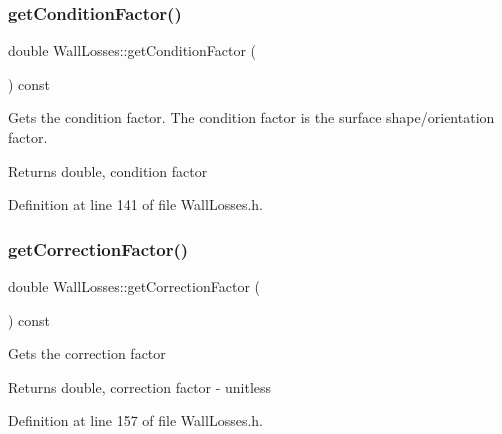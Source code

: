 \subsubsection{\texorpdfstring{get\+Condition\+Factor()}{getConditionFactor()}\hspace{0.1cm}{\footnotesize\ttfamily [3/3]}}
{\footnotesize\ttfamily double Wall\+Losses\+::get\+Condition\+Factor (\begin{DoxyParamCaption}{ }\end{DoxyParamCaption}) const\hspace{0.3cm}{\ttfamily [inline]}}

Gets the condition factor. The condition factor is the surface shape/orientation factor. \begin{DoxyReturn}{Returns}
double, condition factor 
\end{DoxyReturn}


Definition at line 141 of file Wall\+Losses.\+h.

\mbox{\label{class_wall_losses_a4ce6a0ec36cd868b14b041f18251cb6d}} 
\subsubsection{\texorpdfstring{get\+Correction\+Factor()}{getCorrectionFactor()}\hspace{0.1cm}{\footnotesize\ttfamily [1/3]}}
{\footnotesize\ttfamily double Wall\+Losses\+::get\+Correction\+Factor (\begin{DoxyParamCaption}{ }\end{DoxyParamCaption}) const\hspace{0.3cm}{\ttfamily [inline]}}

Gets the correction factor \begin{DoxyReturn}{Returns}
double, correction factor -\/ unitless 
\end{DoxyReturn}


Definition at line 157 of file Wall\+Losses.\+h.

\mbox{\label{class_wall_losses_a4ce6a0ec36cd868b14b041f18251cb6d}} 
